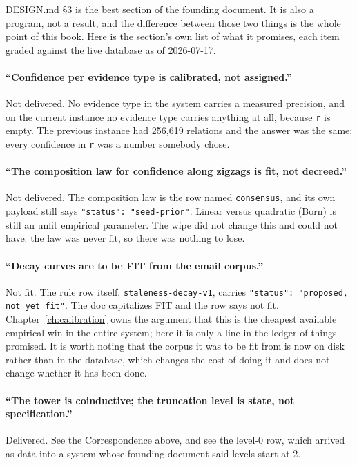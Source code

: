 DESIGN.md \S3 is the best section of the founding document. It is also a program, not a result, and the difference between those two things is the whole point of this book. Here is the section's own list of what it promises, each item graded against the live database as of 2026-07-17.

\paragraph{``Confidence per evidence type is calibrated, not assigned.''} Not delivered. No evidence type in the system carries a measured precision, and on the current instance no evidence type carries anything at all, because \texttt{r} is empty. The previous instance had 256,619 relations and the answer was the same: every confidence in \texttt{r} was a number somebody chose.

\paragraph{``The composition law for confidence along zigzags is fit, not decreed.''} Not delivered. The composition law is the row named \texttt{consensus}, and its own payload still says \texttt{"status": "seed-prior"}. Linear versus quadratic (Born) is still an unfit empirical parameter. The wipe did not change this and could not have: the law was never fit, so there was nothing to lose.

\paragraph{``Decay curves are to be FIT from the email corpus.''} Not fit. The rule row itself, \texttt{staleness-decay-v1}, carries \texttt{"status": "proposed, not yet fit"}. The doc capitalizes FIT and the row says not fit. Chapter~\ref{ch:calibration} owns the argument that this is the cheapest available empirical win in the entire system; here it is only a line in the ledger of things promised. It is worth noting that the corpus it was to be fit from is now on disk rather than in the database, which changes the cost of doing it and does not change whether it has been done.

\paragraph{``The tower is coinductive; the truncation level is state, not specification.''} Delivered. See the Correspondence above, and see the level-0 row, which arrived as data into a system whose founding document said levels start at 2.

